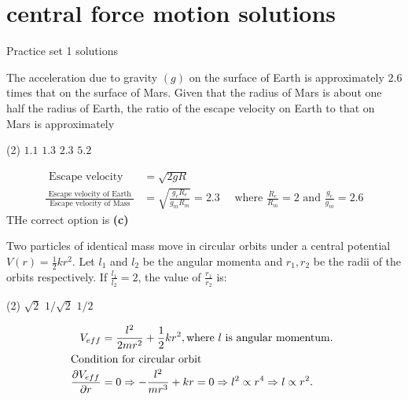 \chapter{central force motion solutions}
\begin{abox}
	Practice set 1 solutions
	\end{abox}
\begin{enumerate}
	\begin{minipage}{\textwidth}
		\item The acceleration due to gravity $(g)$ on the surface of Earth is approximately $2.6$ times that on the surface of Mars. Given that the radius of Mars is about one half the radius of Earth, the ratio of the escape velocity on Earth to that on Mars is approximately
	\end{minipage}
	\begin{tasks}(2)
		\task[\textbf{A.}] $1.1$
		\task[\textbf{B.}]$1.3$
		\task[\textbf{C.}]$2.3$
		\task[\textbf{D.}]$5.2$
	\end{tasks}
\begin{answer}
\begin{align*}
	\text { Escape velocity }&=\sqrt{2 g R}\\
\frac{\text { Escape velocity of Earth }}{\text { Escape velocity of Mass }}&=\sqrt{\frac{g_{e} R_{e}}{g_{m} R_{m}}}=2.3 \quad \text { where } \frac{R_{e}}{R_{m}}=2 \text { and } \frac{g_{e}}{g_{m}}=2.6
\end{align*}
	THe correct option is \textbf{(c)}
\end{answer}
\begin{minipage}{\textwidth}
	\item Two particles of identical mass move in circular orbits under a central potential $V(r)=\frac{1}{2} k r^{2}$. Let $l_{1}$ and $l_{2}$ be the angular momenta and $r_{1}, r_{2}$ be the radii of the orbits respectively. If $\frac{l_{1}}{l_{2}}=2$, the value of $\frac{r_{1}}{r_{2}}$ is:
\end{minipage}
\begin{tasks}(2)
	\task[\textbf{A.}] $\sqrt{2}$
	\task[\textbf{B.}]$1 / \sqrt{2}$
	\task[\textbf{D.}] $1 / 2$
\end{tasks}
\begin{answer}
	\begin{align*}
	 V_{e f f}&=\frac{l^{2}}{2 m r^{2}}+\frac{1}{2} k r^{2}, \text{where $l$ is angular momentum. }\\
	\intertext{Condition for circular orbit} \frac{\partial V_{e f f}}{\partial r}&=0 \Rightarrow-\frac{l^{2}}{m r^{3}}+k r=0 \Rightarrow l^{2} \propto r^{4} \Rightarrow l \propto r^{2}.\\

\end{align*}
\end{answer}
\end{enumerate}
